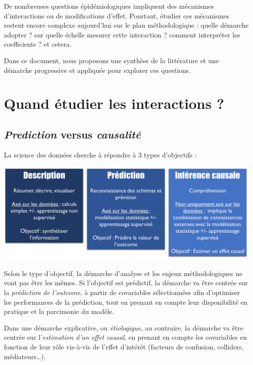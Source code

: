 \documentclass[
]{book}
\begin{document}
De nombreuses questions épidémiologiques impliquent des mécanismes d'interactions ou de modifications d'effet. Pourtant, étudier ces mécanismes restent encore complexe aujourd'hui sur le plan méthodologique : quelle démarche adopter ? sur quelle échelle mesurer cette interaction ? comment interpréter les coefficients ? et cetera.

Dans ce document, nous proposons une synthèse de la littérature et une démarche progressive et appliquée pour explorer ces questions.

\hypertarget{quand-uxe9tudier-les-interactions}{%
\section{Quand étudier les interactions ?}\label{quand-uxe9tudier-les-interactions}}

\hypertarget{prediction-versus-causalituxe9}{%
\subsection{\texorpdfstring{\emph{Prediction} versus \emph{causalité}}{Prediction versus causalité}}\label{prediction-versus-causalituxe9}}

La science des données cherche à répondre à 3 types d'objectifs \citet{hernan2019second} :

\includegraphics[width=1\textwidth,height=\textheight]{img/threetask.png}

Selon le type d'objectif, la démarche d'analyse et les enjeux méthodologiques ne vont pas être les mêmes. Si l'objectif est prédictif, la démarche va être centrée sur la \emph{prédiction de l'outcome}, à partir de covariables sélectionnées afin d'optimiser les performances de la prédiction, tout en prenant en compte leur disponibilité en pratique et la parcimonie du modèle.

Dans une démarche explicative, ou \emph{étiologique}, au contraire, la démarche va être centrée sur l'\emph{estimation d'un effet causal}, en prenant en compte les covariables en fonction de leur rôle vis-à-vis de l'effet d'intérêt (facteurs de confusion, colliders, médiateurs\ldots).
\end{document}
